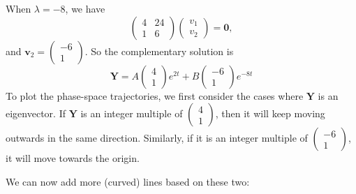 \documentclass[a4paper]{article}
\begin{document}
\begin{eg}
  When $\lambda = -8$, we have
  \[
    \begin{pmatrix}
      4 & 24\\
      1 & 6
    \end{pmatrix}
    \begin{pmatrix}
      v_1\\v_2
    \end{pmatrix} = \mathbf{0},
  \]
  and $\mathbf{v}_2 =
  \begin{pmatrix}
    -6 \\1
  \end{pmatrix}$. So the complementary solution is
  \[
    \mathbf{Y} = A
    \begin{pmatrix}
      4\\1
    \end{pmatrix}e^{2t} + B
    \begin{pmatrix}
      -6\\1
    \end{pmatrix}e^{-8t}
  \]
  To plot the phase-space trajectories, we first consider the cases where $\mathbf{Y}$ is an eigenvector. If $\mathbf{Y}$ is an integer multiple of $\begin{pmatrix}4\\1\end{pmatrix}$, then it will keep moving outwards in the same direction. Similarly, if it is an integer multiple of $\begin{pmatrix}-6\\1\end{pmatrix}$, it will move towards the origin.
  \begin{center}
  \end{center}
  We can now add more (curved) lines based on these two:
  \begin{center}
\end{center}
\end{eg}
\end{document}
